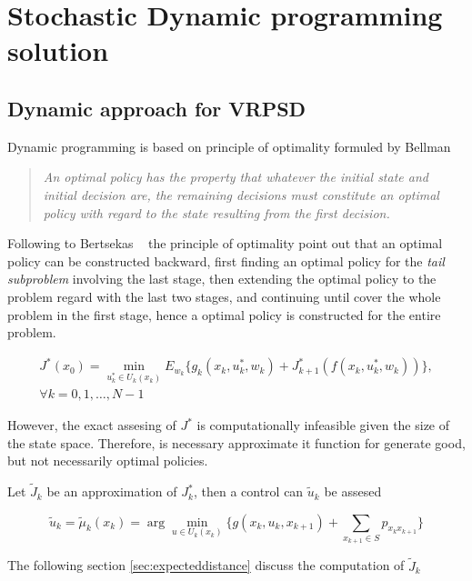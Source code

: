 \chapter{Stochastic Dynamic programming solution}
\label{chap:dp_methodology}


\section{Dynamic approach for VRPSD}

Dynamic programming is based on principle of optimality formuled by Bellman ~\cite{bellman_theory_1954}

\begin{quote}
 \textit{An optimal policy has the property that whatever the initial state and initial decision are, the remaining decisions must constitute an optimal policy with regard to the state resulting from the first decision.}
\end{quote}

Following to Bertsekas ~\cite{bertsekas_dynamic_1995} the principle of optimality point out that an optimal policy can be constructed backward, first finding an optimal policy for the \textit{tail subproblem} involving the last stage, then extending the optimal policy to the problem regard with the last two stages, and continuing until cover the whole problem in the first stage, hence a optimal policy is constructed for the entire problem.

\begin{multline}
 J^*(x_0) = \min\limits_{u_k^*\in U_k(x_k)}E_{w_k}\biggr\{g_k(x_k,u_k^*,w_k)+J^*_{k+1}(f(x_k,u_k^*,w_k))\biggr\},\\
\forall k=0,1,\ldots,N-1
\end{multline}

However, the exact assesing of $J^*$ is computationally infeasible given the size of the state space. Therefore, is necessary approximate it function for generate good, but not necessarily optimal policies.

Let $\tilde{J}_k$ be an approximation of $J^*_k$, then a control can $\tilde{u}_k$ be assesed

\begin{equation}\label{eq:control_aprox}
\tilde{u}_k=\tilde{\mu}_k(x_k)=\arg \min\limits_{u\in U_k(x_k)} \biggr\{ g(x_k,u_k,x_{k+1}) + \sum_{x_{k+1}\in S}p_{x_kx_{k+1}}\biggr\}
\end{equation}

The following section \ref{sec:expecteddistance} discuss the computation of $\tilde{J}_k$

